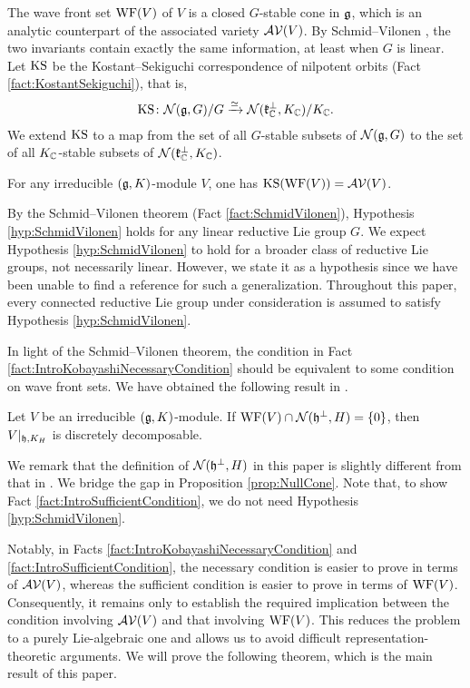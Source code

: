 The wave front set $\mathrm{WF}(V)$ of $V$ is a closed $G$-stable cone in $\mathfrak{g}$, which is an analytic counterpart of the associated variety $\mathcal{AV}(V)$.
By Schmid--Vilonen \cite{ScVi00}, the two invariants contain exactly the same information, at least when $G$ is linear.
Let $\mathrm{KS}$ be the Kostant--Sekiguchi correspondence of nilpotent orbits (Fact \ref{fact:KostantSekiguchi}), that is,
\begin{align*}
	\mathrm{KS} \colon \mathcal{N}(\mathfrak{g}, G)/G \xrightarrow{\simeq} \mathcal{N}(\mathfrak{k}_{\mathbb{C}}^\perp, K_{\mathbb{C}})/K_{\mathbb{C}}.
\end{align*}
We extend $\mathrm{KS}$ to a map from the set of all $G$-stable subsets of $\mathcal{N}(\mathfrak{g}, G)$ to the set of all $K_{\mathbb{C}}$-stable subsets of $\mathcal{N}(\mathfrak{k}_{\mathbb{C}}^\perp, K_{\mathbb{C}})$.

\begin{hypothesis} \label{hyp:SchmidVilonen}
	For any irreducible $(\mathfrak{g}, K)$-module $V$, one has $\mathrm{KS}(\mathrm{WF}(V)) = \mathcal{AV}(V)$.
\end{hypothesis}

By the Schmid--Vilonen theorem \cite{ScVi00} (Fact \ref{fact:SchmidVilonen}), Hypothesis \ref{hyp:SchmidVilonen} holds for any linear reductive Lie group $G$.
We expect Hypothesis \ref{hyp:SchmidVilonen} to hold for a broader class of reductive Lie groups, not necessarily linear.
However, we state it as a hypothesis since we have been unable to find a reference for such a generalization.
Throughout this paper, every connected reductive Lie group under consideration is assumed to satisfy Hypothesis \ref{hyp:SchmidVilonen}.

In light of the Schmid--Vilonen theorem, the condition in Fact \ref{fact:IntroKobayashiNecessaryCondition} should be equivalent to some condition on wave front sets.
We have obtained the following result in \cite[Theorem 17]{Ki24}.

\begin{fact} \label{fact:IntroSufficientCondition}
	Let $V$ be an irreducible $(\mathfrak{g}, K)$-module.
	If $\mathrm{WF}(V)\cap \mathcal{N}(\mathfrak{h}^\perp, H) = \left\{0 \right\}$, then $V|_{\mathfrak{h}, K_H}$ is discretely decomposable.
\end{fact}

We remark that the definition of $\mathcal{N}(\mathfrak{h}^\perp, H)$ in this paper is slightly different from that in \cite{Ki24}.
We bridge the gap in Proposition \ref{prop:NullCone}.
Note that, to show Fact \ref{fact:IntroSufficientCondition}, we do not need Hypothesis \ref{hyp:SchmidVilonen}.

Notably, in Facts \ref{fact:IntroKobayashiNecessaryCondition} and \ref{fact:IntroSufficientCondition}, the necessary condition is easier to prove in terms of $\mathcal{AV}(V)$, whereas the sufficient condition is easier to prove in terms of $\mathrm{WF}(V)$.
Consequently, it remains only to establish the required implication between the condition involving $\mathcal{AV}(V)$ and that involving $\mathrm{WF}(V)$.
This reduces the problem to a purely Lie-algebraic one and allows us to avoid difficult representation-theoretic arguments.
We will prove the following theorem, which is the main result of this paper.

